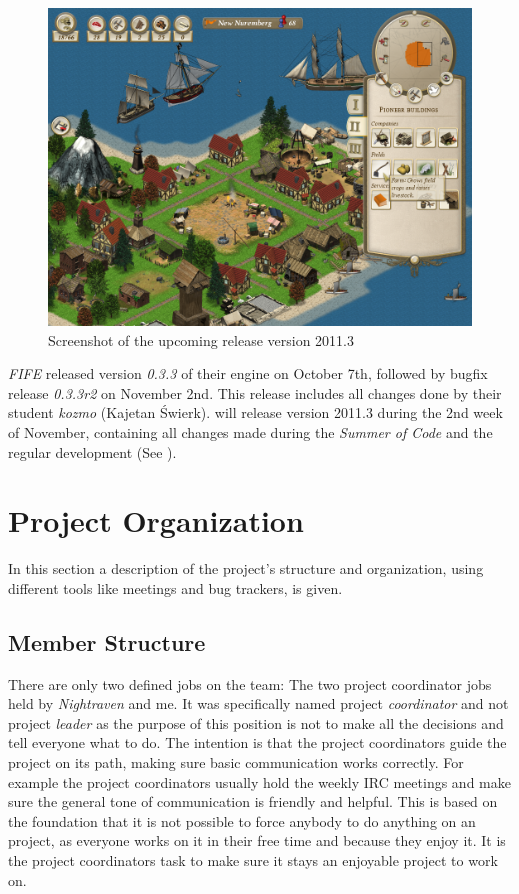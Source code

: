 \begin{figure}[!htb]
	\begin{center}
		\includegraphics[scale=0.28]{pics/uhscreenshot}
	\end{center}
    \caption{Screenshot of the upcoming \UH{} release version 2011.3}
    \label{uhscreenshot}
\end{figure}

\textit{FIFE} released version \textit{0.3.3} of their engine on October 7th,
followed by bugfix release \textit{0.3.3r2} on November 2nd. This release includes all changes done by their student
\textit{kozmo} (Kajetan Świerk). \UH{} will release \UH{} version 2011.3 during the 2nd week of November, containing all
changes made during the \textit{Summer of Code} and the regular development (See ).


\section{Project Organization}
In this section a description of the project's structure and organization, using
different tools like meetings and bug trackers, is given.

\subsection{Member Structure}
There are only two defined jobs on the team: The two project coordinator jobs held by \textit{Nightraven} and me. It was
specifically named project \textit{coordinator} and not project \textit{leader} as the purpose of this position is not to
make all the decisions and tell everyone what to do. The intention is that the project coordinators guide the project on
its path, making sure basic communication works correctly. For example the project coordinators usually hold the weekly
IRC meetings and make sure the general tone of communication is friendly and helpful. This is based on the foundation
that it is not possible to force anybody to do anything on an \OS{} project, as everyone works on it in their free time
and because they enjoy it. It is the project coordinators task to make sure it stays an enjoyable project to work on.

